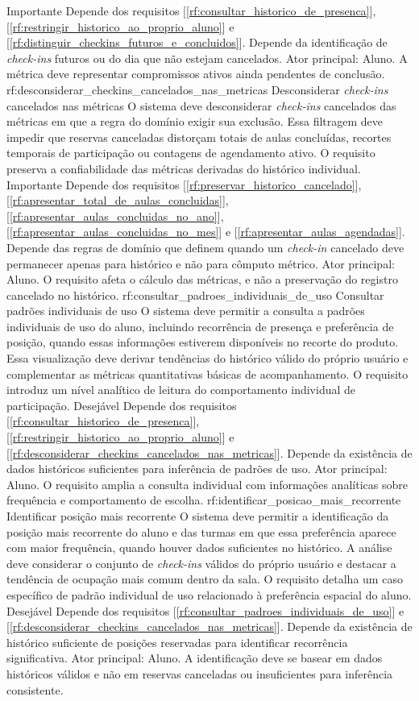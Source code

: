 {Importante}
{Depende dos requisitos [\ref{rf:consultar_historico_de_presenca}], [\ref{rf:restringir_historico_ao_proprio_aluno}] e [\ref{rf:distinguir_checkins_futuros_e_concluidos}]. Depende da identificação de \textit{check-ins} futuros ou do dia que não estejam cancelados.}
{Ator principal: Aluno. A métrica deve representar compromissos ativos ainda pendentes de conclusão.}
\reqfuncfull
{rf:desconsiderar_checkins_cancelados_nas_metricas}
{Desconsiderar \textit{check-ins} cancelados nas métricas}
{O sistema deve desconsiderar \textit{check-ins} cancelados das métricas em que a regra do domínio exigir sua exclusão. Essa filtragem deve impedir que reservas canceladas distorçam totais de aulas concluídas, recortes temporais de participação ou contagens de agendamento ativo. O requisito preserva a confiabilidade das métricas derivadas do histórico individual.}
{Importante}
{Depende dos requisitos [\ref{rf:preservar_historico_cancelado}], [\ref{rf:apresentar_total_de_aulas_concluidas}], [\ref{rf:apresentar_aulas_concluidas_no_ano}], [\ref{rf:apresentar_aulas_concluidas_no_mes}] e [\ref{rf:apresentar_aulas_agendadas}]. Depende das regras de domínio que definem quando um \textit{check-in} cancelado deve permanecer apenas para histórico e não para cômputo métrico.}
{Ator principal: Aluno. O requisito afeta o cálculo das métricas, e não a preservação do registro cancelado no histórico.}
\reqfuncfull
{rf:consultar_padroes_individuais_de_uso}
{Consultar padrões individuais de uso}
{O sistema deve permitir a consulta a padrões individuais de uso do aluno, incluindo recorrência de presença e preferência de posição, quando essas informações estiverem disponíveis no recorte do produto. Essa visualização deve derivar tendências do histórico válido do próprio usuário e complementar as métricas quantitativas básicas de acompanhamento. O requisito introduz um nível analítico de leitura do comportamento individual de participação.}
{Desejável}
{Depende dos requisitos [\ref{rf:consultar_historico_de_presenca}], [\ref{rf:restringir_historico_ao_proprio_aluno}] e [\ref{rf:desconsiderar_checkins_cancelados_nas_metricas}]. Depende da existência de dados históricos suficientes para inferência de padrões de uso.}
{Ator principal: Aluno. O requisito amplia a consulta individual com informações analíticas sobre frequência e comportamento de escolha.}
\reqfuncfull
{rf:identificar_posicao_mais_recorrente}
{Identificar posição mais recorrente}
{O sistema deve permitir a identificação da posição mais recorrente do aluno e das turmas em que essa preferência aparece com maior frequência, quando houver dados suficientes no histórico. A análise deve considerar o conjunto de \textit{check-ins} válidos do próprio usuário e destacar a tendência de ocupação mais comum dentro da sala. O requisito detalha um caso específico de padrão individual de uso relacionado à preferência espacial do aluno.}
{Desejável}
{Depende dos requisitos [\ref{rf:consultar_padroes_individuais_de_uso}] e [\ref{rf:desconsiderar_checkins_cancelados_nas_metricas}]. Depende da existência de histórico suficiente de posições reservadas para identificar recorrência significativa.}
{Ator principal: Aluno. A identificação deve se basear em dados históricos válidos e não em reservas canceladas ou insuficientes para inferência consistente.}
